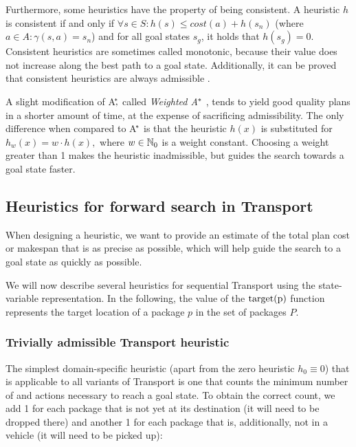 Furthermore, some heuristics have the property of being consistent. A heuristic $h$ is consistent
if and only if $\forall s \in S : h(s) \leq cost(a) + h(s_n)$
(where $a \in A : \gamma(s, a) = s_n$) and for all goal states $s_g$, it holds that $h(s_g) = 0$.
Consistent heuristics are sometimes called monotonic, because their value
does not increase along the best path to a goal state. Additionally,
it can be proved that consistent heuristics are always admissible
\citep[Section~4.1]{Russell1995}.



A slight modification of A$^{\kern-.15em*}{\kern-.30em,}$ called \textit{Weighted A$^{\kern-.05em*}$} \citep{Pohl1970},
tends to yield good quality plans in a shorter amount of time,
at the expense of
sacrificing admissibility. The only difference
when compared to A$^{\kern-.15em*}$ is that the heuristic $h(x)$
is substituted for $h_w(x) = w \cdot h(x),$
where $w \in \mathbb{N}_0$ is a weight constant. Choosing a weight greater
than 1 makes the heuristic inadmissible,
but guides the search towards a goal state faster.


\subsection{Heuristics for forward search in Transport}\label{seq-heuristics}

When designing a heuristic, we want to provide an estimate
of the total plan cost or makespan
that is as precise as possible, which
will help guide the search to a goal state as quickly as
possible.

We will now describe several heuristics for sequential
Transport using the state-variable representation.
In the following, the value of the $\textrm{target(p)}$ function represents
the target location of a package $p$ in the set of packages $P$.

\subsubsection{Trivially admissible Transport heuristic}\label{sfa0}

The simplest domain-specific heuristic (apart from the zero heuristic $h_0 \equiv 0$) that is applicable to all variants of Transport
is one that counts the minimum number of \pickup{} and \drop{} actions
necessary to reach a goal state.
To obtain the correct count, we add 1 for each
package that is not yet at its destination (it will need to be dropped there) and another 1 for each package
that is, additionally, not in a vehicle (it will need to be picked up):

